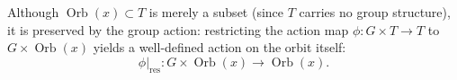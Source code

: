 \begin{content}
Although $\operatorname{Orb}(x) \subset T$ is merely a subset (since $T$ carries no group structure), it is preserved by the group action: restricting the action map $\phi \colon G \times T \to T$ to $G \times \operatorname{Orb}(x)$ yields a well-defined action on the orbit itself:
\[
\phi\big|_{\text{res}} \colon G \times \operatorname{Orb}(x) \longrightarrow \operatorname{Orb}(x).
\]

\end{content}


